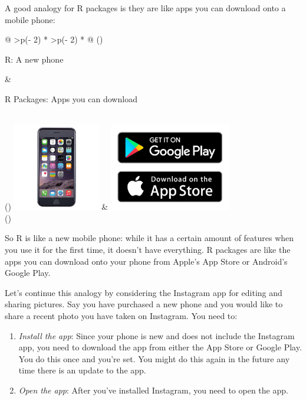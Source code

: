 \documentclass[
  letterpaper,
  DIV=11,
  numbers=noendperiod]{scrreprt}
\theoremstyle{definition}
\theoremstyle{remark}
\begin{document}
A good analogy for R packages is they are like apps you can download
onto a mobile phone:

\begin{longtable}[]{@{}
  >{\centering\arraybackslash}p{(\columnwidth - 2\tabcolsep) * }
  >{\centering\arraybackslash}p{(\columnwidth - 2\tabcolsep) * }@{}}
\toprule()
\begin{minipage}[b]{\linewidth}\centering
R: A new phone
\end{minipage} & \begin{minipage}[b]{\linewidth}\centering
R Packages: Apps you can download
\end{minipage} \\
\midrule()
\endhead
\includegraphics[width=\textwidth,height=1.5in]{images/iphone.jpg} &
\includegraphics[width=\textwidth,height=1.5in]{images/apps.jpg} \\
\bottomrule()
\end{longtable}

So R is like a new mobile phone: while it has a certain amount of
features when you use it for the first time, it doesn't have everything.
R packages are like the apps you can download onto your phone from
Apple's App Store or Android's Google Play.

Let's continue this analogy by considering the Instagram app for editing
and sharing pictures. Say you have purchased a new phone and you would
like to share a recent photo you have taken on Instagram. You need to:

\begin{enumerate}
\def\labelenumi{\arabic{enumi}.}
\item
  \emph{Install the app}: Since your phone is new and does not include
  the Instagram app, you need to download the app from either the App
  Store or Google Play. You do this once and you're set. You might do
  this again in the future any time there is an update to the app.
\item
  \emph{Open the app}: After you've installed Instagram, you need to
  open the app.
\end{enumerate}
\end{document}
